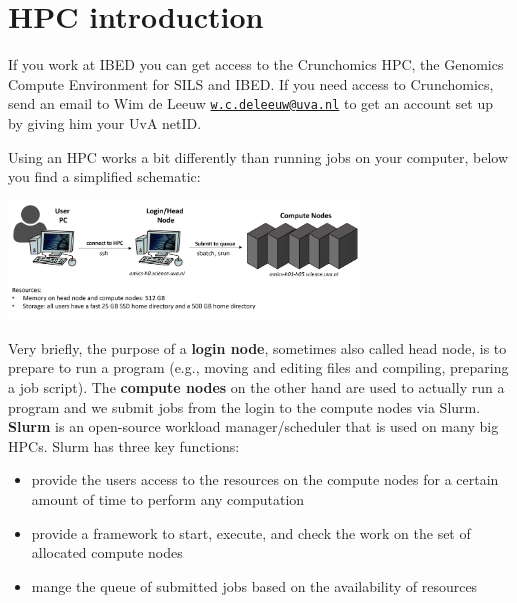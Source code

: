 \documentclass[
  letterpaper,
  DIV=11,
  numbers=noendperiod]{scrreprt}
\author{}
\date{}
\providecommand{\tightlist}{%
  \setlength{\itemsep}{0pt}\setlength{\parskip}{0pt}}\usepackage{longtable,booktabs,array}
\renewcommand*\contentsname{Table of contents}
\newcommand\contentsname{Table of contents}
\begin{document}

\renewcommand*\contentsname{Table of contents}
{
\hypersetup{linkcolor=}
\setcounter{tocdepth}{1}
\tableofcontents
}
\section{HPC introduction}\label{hpc-introduction}

If you work at IBED you can get access to the Crunchomics HPC, the
Genomics Compute Environment for SILS and IBED. If you need access to
Crunchomics, send an email to Wim de Leeuw
\href{mailto:w.c.deleeuw@uva.nl}{\nolinkurl{w.c.deleeuw@uva.nl}} to get
an account set up by giving him your UvA netID.

Using an HPC works a bit differently than running jobs on your computer,
below you find a simplified schematic:

\begin{center}
\includegraphics[width=0.7\textwidth,height=\textheight]{../img/crunchomics1.png}
\end{center}

Very briefly, the purpose of a \textbf{login node}, sometimes also
called head node, is to prepare to run a program (e.g., moving and
editing files and compiling, preparing a job script). The
\textbf{compute nodes} on the other hand are used to actually run a
program and we submit jobs from the login to the compute nodes via
Slurm. \textbf{Slurm} is an open-source workload manager/scheduler that
is used on many big HPCs. Slurm has three key functions:

\begin{itemize}
\tightlist
\item
  provide the users access to the resources on the compute nodes for a
  certain amount of time to perform any computation
\item
  provide a framework to start, execute, and check the work on the set
  of allocated compute nodes
\item
  mange the queue of submitted jobs based on the availability of
  resources
\end{itemize}
\end{document}
